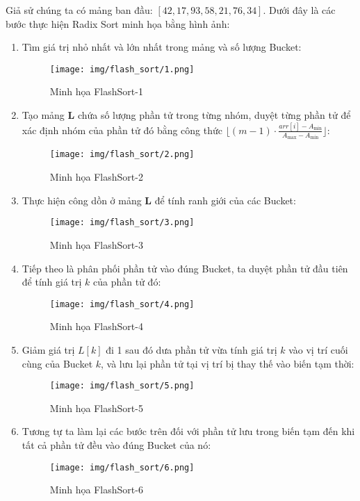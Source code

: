 Giả sử chúng ta có mảng ban đầu: $[42, 17, 93, 58, 21, 76, 34]$. Dưới đây là các bước thực hiện Radix Sort minh họa bằng hình ảnh:

\begin{enumerate}
    \item Tìm giá trị nhỏ nhất và lớn nhất trong mảng và số lượng Bucket:
    \begin{figure}[H]
        \centering
        \texttt{[image: img/flash\_sort/1.png]}
        \caption{Minh họa FlashSort-1}
    \end{figure}
    
    \item Tạo mảng \textbf{L} chứa số lượng phần tử trong từng nhóm, duyệt từng phần tử để xác định nhóm của phần tử đó bằng công thức $\lfloor (m - 1) \cdot \frac{arr[i] - A_{\text{min}}}{A_{\text{max}} - A_{\text{min}}} \rfloor$:
    \begin{figure}[H]
        \centering
        \texttt{[image: img/flash\_sort/2.png]}
        \caption{Minh họa FlashSort-2}
    \end{figure}
    
    \item Thực hiện công dồn ở mảng \textbf{L} để tính ranh giới của các Bucket: 
    \begin{figure}[H]
        \centering
        \texttt{[image: img/flash\_sort/3.png]}
        \caption{Minh họa FlashSort-3}
    \end{figure}
    
    \item Tiếp theo là phân phối phần tử vào đúng Bucket, ta duyệt phần tử đầu tiên để tính giá trị $k$ của phần tử đó:
    \begin{figure}[H]
        \centering
        \texttt{[image: img/flash\_sort/4.png]}
        \caption{Minh họa FlashSort-4}
    \end{figure}
    
    \item Giảm giá trị $L[k]$ đi 1 sau đó dưa phần tử vừa tính giá trị $k$ vào vị trí cuối cùng của Bucket $k$, và lưu lại phần tử tại vị trí bị thay thế vào biến tạm thời:
    \begin{figure}[H]
        \centering
        \texttt{[image: img/flash\_sort/5.png]}
        \caption{Minh họa FlashSort-5}
    \end{figure}
    
    \item Tương tự ta làm lại các bước trên đối với phần tử lưu trong biến tạm đến khi tất cả phần tử đều vào đúng Bucket của nó:
    \begin{figure}[H]
        \centering
        \texttt{[image: img/flash\_sort/6.png]}
        \caption{Minh họa FlashSort-6}
    \end{figure}
    

\end{enumerate}
